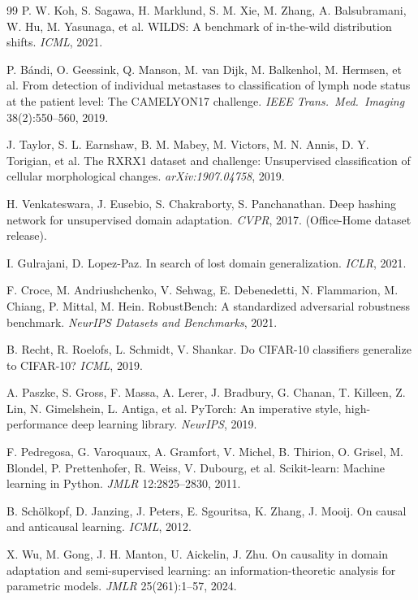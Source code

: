 \begin{thebibliography}{99}
 P. W. Koh, S. Sagawa, H. Marklund, S. M. Xie, M. Zhang,
A. Balsubramani, W. Hu, M. Yasunaga, et al. WILDS: A benchmark of in-the-wild
distribution shifts. \emph{ICML}, 2021.

 P. B\'andi, O. Geessink, Q. Manson, M. van Dijk,
M. Balkenhol, M. Hermsen, et al. From detection of individual metastases to
classification of lymph node status at the patient level: The CAMELYON17 challenge.
\emph{IEEE Trans.\ Med.\ Imaging} 38(2):550--560, 2019.

 J. Taylor, S. L. Earnshaw, B. M. Mabey, M. Victors,
M. N. Annis, D. Y. Torigian, et al. The RXRX1 dataset and challenge:
Unsupervised classification of cellular morphological changes.
\emph{arXiv:1907.04758}, 2019.

 H. Venkateswara, J. Eusebio, S. Chakraborty,
S. Panchanathan. Deep hashing network for unsupervised domain adaptation.
\emph{CVPR}, 2017. (Office-Home dataset release).

 I. Gulrajani, D. Lopez-Paz. In search of lost
domain generalization. \emph{ICLR}, 2021.

 F. Croce, M. Andriushchenko, V. Sehwag,
E. Debenedetti, N. Flammarion, M. Chiang, P. Mittal, M. Hein.
RobustBench: A standardized adversarial robustness benchmark.
\emph{NeurIPS Datasets and Benchmarks}, 2021.

 B. Recht, R. Roelofs, L. Schmidt, V. Shankar.
Do CIFAR-10 classifiers generalize to CIFAR-10? \emph{ICML}, 2019.

 A. Paszke, S. Gross, F. Massa, A. Lerer, J. Bradbury,
G. Chanan, T. Killeen, Z. Lin, N. Gimelshein, L. Antiga, et al.
PyTorch: An imperative style, high-performance deep learning library.
\emph{NeurIPS}, 2019.

 F. Pedregosa, G. Varoquaux, A. Gramfort, V. Michel,
B. Thirion, O. Grisel, M. Blondel, P. Prettenhofer, R. Weiss, V. Dubourg, et al.
Scikit-learn: Machine learning in Python. \emph{JMLR} 12:2825--2830, 2011.

 B. Sch\"olkopf, D. Janzing, J. Peters, E. Sgouritsa,
K. Zhang, J. Mooij. On causal and anticausal learning. \emph{ICML}, 2012.

 X. Wu, M. Gong, J. H. Manton, U. Aickelin, J. Zhu.
On causality in domain adaptation and semi-supervised learning: an information-theoretic
analysis for parametric models. \emph{JMLR} 25(261):1--57, 2024.


\end{thebibliography}
